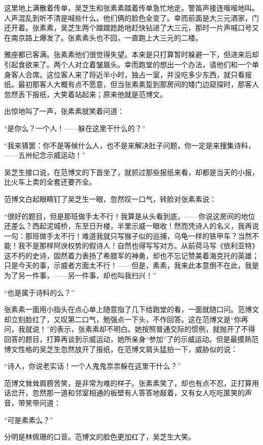 \par 这里地上满散着传单，吴芝生和张素素踏着传单急忙地走。警笛声接连喈喈地叫。人声混乱到听不清是喊些什么。他们俩的脸色全变了。幸而前面是大三元酒家，门还开着。张素素，吴芝生两个踉踉跄跄地赶快钻进了大三元，那时一片声喊口号又在南京路上爆发了。张素素头也不回，一直跑上大三元的二楼。
\par 雅座都已客满。张素素他们很觉得失望。本来是只打算暂时躲避一下，但进来后却引起食欲来了。两个人对立着皱眉头。幸而跑堂的想出一个办法，请他们和一个单身客人合席。这位客人来了将近半小时，独占一室，并没吃多少东西，就只看报纸。最初那客人大概有点不愿意，但当张素素踅到那房间的矮门边窥探时，那客人忽然丢下报纸，大笑着站起来；原来他就是范博文。
\par 出惊地叫了一声，张素素就笑着问道：
\par “是你么？一个人！——躲在这里干什么的？”
\par “我来猜罢：你不是等候什么人，也不是来解决肚子问题，你一定是来搜集诗料，——五卅纪念示威运动！”
\par 吴芝生接口说，在范博文的下首坐了，就抓过那些报纸来看，却都是当天的小报，比火车上卖的全套还要齐全。
\par 范博文白起眼睛钉了吴芝生一眼，忽然叹一口气，转脸对张素素说：
\par “很好的题目，但是那班做手太不行！我算是从头看到底，——你说这房间的地位还差么？西起泥城桥，东至日升楼，半里示威一眼收！然而凭诗人的名义，我再说一句：那班做手太不行！难道我就只写猴子似的巡捕，乌龟一样的铁甲车？当然不能！我不是那样阿谀权势的假诗人！自然也得写写对方。从前荷马写《依利亚特》这不朽的史诗，固然着力表扬了希腊军的神勇，却也不忘记赞美着海克托的英雄；只是今天的事，示威者方面太不行！——但是，素素，我来此本意倒不在此，我是为了另一件事，——另一件事，却也叫我扫兴！”
\par “也是属于诗料的么？”
\par 张素素一面用小指头在点心单上随意指了几下给跑堂的看，一面就随口问。范博文却立刻脸红了，又叹第二口气，勉强点一下头，不作回答。这在范博文是“你再问，我就说！”的表示，张素素却不明白。她按照普通交际的惯例，就抛开了不得回答的题目，打算再谈到示威运动，她所亲身“参加”了的示威运动。但是最摸熟范博文性格的吴芝生忽然放开了报纸，在范博文肩头猛拍一下，威胁似的说：
\par “诗人，你说老实话！一个人鬼鬼祟祟躲在这里干什么？”
\par 范博文耸耸肩膀苦笑，是非常为难的样子。张素素笑了，却也有点不忍，正打算用话岔开，忽然那一道和邻室相通的板壁有人答答地敲着，又有女人吃吃匿笑的声音，带笑带问道：
\par “可是素素么？”
\par 分明是林佩珊的口音。范博文的脸色更加红了，吴芝生大笑。
